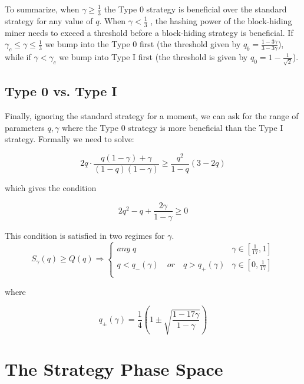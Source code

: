 \documentclass[letterpaper,12pt]{report}
\theoremstyle{plain}
\theoremstyle{definition}
\begin{document}
To summarize, when $\gamma\geq\frac{1}{3}$ the Type 0 strategy is beneficial over the standard strategy for any value of $q$. When $\gamma<\frac{1}{3}$ , the hashing power of the block-hiding miner needs to exceed a threshold before a block-hiding strategy is beneficial. If $\gamma_c\leq\gamma\leq\frac{1}{3}$ we bump into the Type 0 first (the threshold given by $q_b=\frac{1-3\gamma}{3-3\gamma}$), while if $\gamma<\gamma_c$ we bump into Type I first (the threshold is given by $q_0=1-\frac{1}{\sqrt{2}}$).

\subsection{Type 0 vs. Type I}

Finally, ignoring the standard strategy for a moment, we can ask for the range of parameters $q,\gamma$ where the Type 0 strategy is more beneficial than the Type I strategy. Formally we need to solve:

\begin{equation}\label{eq:type0overtype1}
2q\cdot\frac{q(1-\gamma)+\gamma}{(1-q)(1-\gamma)}\geq \dfrac{q^2}{1-q}\left(
3-2q
\right)
\end{equation}

which gives the condition

\begin{equation}\label{eq:type0over1condition}
2q^2-q+\frac{2\gamma}{1-\gamma}\geq 0
\end{equation}

This condition is satisfied in two regimes for $\gamma$.
\begin{equation}\label{eq:type0over1gammaregimes}
S_{\gamma}(q)\geq Q(q) \Longrightarrow
\begin{cases}
\mathit{any\;} q & \gamma\in [\frac{1}{17},1] \\ 
q<q_-(\gamma)\quad \mathit{or}\quad q>q_+(\gamma) & \gamma\in [0,\frac{1}{17}] \\ 
\end{cases}
\end{equation}

where 

\begin{equation}\label{qplusminus}
q_{\pm}(\gamma)=\frac{1}{4}\left(1\pm\sqrt{\frac{1-17\gamma}{1-\gamma}}\right)
\end{equation}


\section{The Strategy Phase Space}\label{sec:phasespace}
\end{document}
